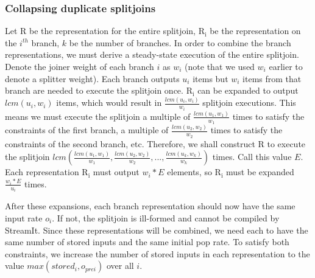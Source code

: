 \subsubsection{Collapsing duplicate splitjoins}

    Let $\mathrm{R}$ be the representation for the entire
splitjoin, $\mathrm{R_i}$ be the representation on the $i^{th}$
branch, $k$ be the number of branches. In order to combine the
branch representations, we must derive a steady-state execution of
the entire splitjoin. Denote the joiner weight of each branch $i$
as $w_i$ (note that we used $w_i$ earlier to denote a splitter
weight). Each branch outputs $u_i$ items but $w_i$ items from that
branch are needed to execute the splitjoin once. $\mathrm{R_i}$
can be expanded to output $lcm(u_i,w_i)$ items, which would result
in $\frac{lcm(u_i,w_i)}{w_i}$ splitjoin executions. This means we
must execute the splitjoin a multiple of
$\frac{lcm(u_1,w_1)}{w_1}$ times to satisfy the constraints of the
first branch, a multiple of $\frac{lcm(u_2,w_2)}{w_2}$ times to
satisfy the constraints of the second branch, etc. Therefore, we
shall construct $\mathrm{R}$ to execute the splitjoin
$lcm(\frac{lcm(u_1,w_1)}{w_1},\frac{lcm(u_2,w_2)}{w_2},...,\frac{lcm(u_k,w_k)}{w_k})$
times. Call this value $E$. Each representation $\mathrm{R_i}$
must output $w_i * E$ elements, so $\mathrm{R_i}$ must be expanded
$\frac{w_i * E}{u_i}$ times.

    After these expansions, each branch representation  should now
have the same input rate $o_i$. If not, the splitjoin is
ill-formed and cannot be compiled by StreamIt. Since these
representations will be combined, we need each to have the same
number of stored inputs and the same initial pop rate. To satisfy
both constraints, we increase the number of stored inputs in each
representation to the value $max(stored_i,o_{prei})$ over all $i$.

